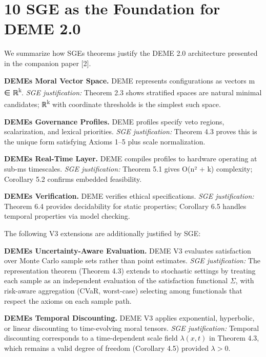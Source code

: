 \documentclass[12pt]{article}
\theoremstyle{plain}
\theoremstyle{definition}
\theoremstyle{remark}
\begin{document}
\section{10 SGE as the Foundation for DEME
2.0}\label{sge-as-the-foundation-for-deme-2.0}

We summarize how SGE\textquotesingle s theorems justify the DEME 2.0
architecture presented in the companion paper {[}2{]}.

\textbf{DEME\textquotesingle s Moral Vector Space.} DEME represents
configurations as vectors m ∈ ℝ\textsuperscript{k}. \emph{SGE
justification:} Theorem 2.3 shows stratified spaces are natural minimal
candidates; ℝ\textsuperscript{k} with coordinate thresholds is the
simplest such space.

\textbf{DEME\textquotesingle s Governance Profiles.} DEME profiles
specify veto regions, scalarization, and lexical priorities. \emph{SGE
justification:} Theorem 4.3 proves this is the unique form satisfying
Axioms 1--5 plus scale normalization.

\textbf{DEME\textquotesingle s Real-Time Layer.} DEME compiles profiles
to hardware operating at sub-ms timescales. \emph{SGE justification:}
Theorem 5.1 gives O(n² + k) complexity; Corollary 5.2 confirms embedded
feasibility.

\textbf{DEME\textquotesingle s Verification.} DEME verifies ethical
specifications. \emph{SGE justification:} Theorem 6.4 provides
decidability for static properties; Corollary 6.5 handles temporal
properties via model checking.

The following V3 extensions are additionally justified by SGE:

\textbf{DEME\textquotesingle s Uncertainty-Aware Evaluation.} DEME V3
evaluates satisfaction over Monte Carlo sample sets rather than point
estimates. \emph{SGE justification:} The representation theorem
(Theorem 4.3) extends to stochastic settings by treating each sample as
an independent evaluation of the satisfaction functional $\Sigma$, with
risk-aware aggregation (CVaR, worst-case) selecting among functionals
that respect the axioms on each sample path.

\textbf{DEME\textquotesingle s Temporal Discounting.} DEME V3 applies
exponential, hyperbolic, or linear discounting to time-evolving moral
tensors. \emph{SGE justification:} Temporal discounting corresponds to
a time-dependent scale field $\lambda(x, t)$ in Theorem 4.3, which
remains a valid degree of freedom (Corollary 4.5) provided $\lambda > 0$.
\end{document}
